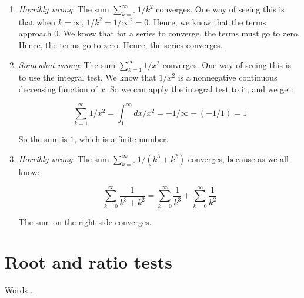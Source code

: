 \documentclass[10pt]{amsart}
\begin{document}
\begin{enumerate}
\item {\em Horribly wrong}: The sum $\sum_{k=0}^\infty 1/k^2$
  converges. One way of seeing this is that when $k = \infty$, $1/k^2
  = 1/\infty^2 = 0$. Hence, we know that the terms approach $0$. We
  know that for a series to converge, the terms must go to
  zero. Hence, the terms go to zero. Hence, the series converges.
\item {\em Somewhat wrong}: The sum $\sum_{k=1}^\infty 1/x^2$
  converges. One way of seeing this is to use the integral test. We
  know that $1/x^2$ is a nonnegative continuous decreasing function of
  $x$. So we can apply the integral test to it, and we get:

  $$\sum_{k=1}^\infty 1/x^2 = \int_1^\infty dx/x^2 = -1/\infty - (-1/1) = 1$$

  So the sum is $1$, which is a finite number.
\item {\em Horribly wrong}: The sum $\sum_{k=0}^\infty 1/(k^3 + k^2)$
  converges, because as we all know:

  $$\sum_{k=0}^\infty \frac{1}{k^3 + k^2} = \sum_{k=0}^\infty \frac{1}{k^3} + \sum_{k=0}^\infty \frac{1}{k^2}$$

  The sum on the right side converges.
\end{enumerate}

\section{Root and ratio tests}

Words ...
\end{document}
